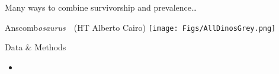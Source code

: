 \documentclass[20pt,usenames,dvipsnames]{beamer}
\begin{document}






\begin{frame}[plain]
\Huge
\begin{center}
Many ways to combine survivorship and prevalence\ldots 
\end{center}
\end{frame}

\begin{frame}
\begin{overlayarea}{\textwidth}{\textheight}
\end{overlayarea}
\end{frame}

\begin{frame}[plain]
\Huge
Anscomb\emph{osaurus}~~\small (HT Alberto Cairo)
\texttt{[image: Figs/AllDinosGrey.png]}
\end{frame}


\begin{frame}[plain]
\Large
\begin{block}{Data \& Methods}
\begin{itemize}[<+->]
\item 
\end{itemize}
\end{block}
\end{frame}





\end{document}
